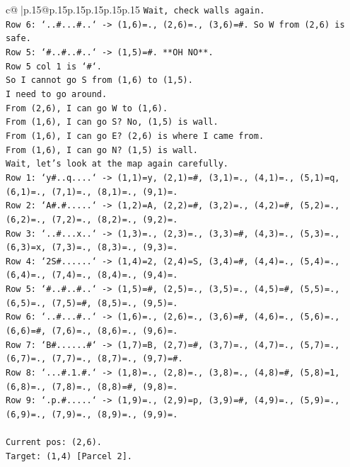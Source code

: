 \documentclass{article}
\begin{document}
{\begin{supertabular}{c@{$\;$}|p{.15\linewidth}@{}p{.15\linewidth}p{.15\linewidth}p{.15\linewidth}p{.15\linewidth}p{.15\linewidth}}
{{{\texttt{Wait, check walls again.} \\
\texttt{Row 6: `..\#...\#..` {-}> (1,6)=., (2,6)=., (3,6)=\#. So W from (2,6) is safe.} \\
\texttt{Row 5: `\#..\#..\#..` {-}> (1,5)=\#. **OH NO**.} \\
\texttt{Row 5 col 1 is `\#`.} \\
\texttt{So I cannot go S from (1,6) to (1,5).} \\
\texttt{I need to go around.} \\
\texttt{From (2,6), I can go W to (1,6).} \\
\texttt{From (1,6), I can go S? No, (1,5) is wall.} \\
\texttt{From (1,6), I can go E? (2,6) is where I came from.} \\
\texttt{From (1,6), I can go N? (1,5) is wall.} \\
\texttt{Wait, let's look at the map again carefully.} \\
\texttt{Row 1: `y\#..q....` {-}> (1,1)=y, (2,1)=\#, (3,1)=., (4,1)=., (5,1)=q, (6,1)=., (7,1)=., (8,1)=., (9,1)=.} \\
\texttt{Row 2: `A\#.\#.....` {-}> (1,2)=A, (2,2)=\#, (3,2)=., (4,2)=\#, (5,2)=., (6,2)=., (7,2)=., (8,2)=., (9,2)=.} \\
\texttt{Row 3: `..\#...x..` {-}> (1,3)=., (2,3)=., (3,3)=\#, (4,3)=., (5,3)=., (6,3)=x, (7,3)=., (8,3)=., (9,3)=.} \\
\texttt{Row 4: `2S\#......` {-}> (1,4)=2, (2,4)=S, (3,4)=\#, (4,4)=., (5,4)=., (6,4)=., (7,4)=., (8,4)=., (9,4)=.} \\
\texttt{Row 5: `\#..\#..\#..` {-}> (1,5)=\#, (2,5)=., (3,5)=., (4,5)=\#, (5,5)=., (6,5)=., (7,5)=\#, (8,5)=., (9,5)=.} \\
\texttt{Row 6: `..\#...\#..` {-}> (1,6)=., (2,6)=., (3,6)=\#, (4,6)=., (5,6)=., (6,6)=\#, (7,6)=., (8,6)=., (9,6)=.} \\
\texttt{Row 7: `B\#......\#` {-}> (1,7)=B, (2,7)=\#, (3,7)=., (4,7)=., (5,7)=., (6,7)=., (7,7)=., (8,7)=., (9,7)=\#.} \\
\texttt{Row 8: `...\#.1.\#.` {-}> (1,8)=., (2,8)=., (3,8)=., (4,8)=\#, (5,8)=1, (6,8)=., (7,8)=., (8,8)=\#, (9,8)=.} \\
\texttt{Row 9: `.p.\#.....` {-}> (1,9)=., (2,9)=p, (3,9)=\#, (4,9)=., (5,9)=., (6,9)=., (7,9)=., (8,9)=., (9,9)=.} \\
\\ 
\texttt{Current pos: (2,6).} \\
\texttt{Target: (1,4) {[}Parcel 2{]}.} \\
}}}
\end{supertabular}}
\end{document}
